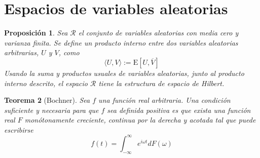 \documentclass[12pt,letterpaper,draft]{book}
\newtheorem{teorema}{Teorema}[chapter]
\newtheorem{proposicion}[teorema]{Proposición}
\newcommand{\R}{\mathbb{R}}
\newcommand{\C}{\mathbb{C}}
\newcommand{\intR}{\int_{-\infty}^{\infty}}
\newcommand{\E}[1]{\mathrm{E}\left[ #1 \right]}
\newcommand{\abso}[1]{\left| #1 \right|}
\begin{document}

\section{Espacios de variables aleatorias}

\begin{proposicion}
Sea $\mathcal{R}$ el conjunto de variables aleatorias con media cero y varianza finita. Se define un producto interno entre dos variables aleatorias arbitrarias, $U$ y $V$, como
\begin{equation}
\langle U , V \rangle := \E{U, \overline{V}}
\end{equation}
Usando la suma y productos usuales de variables aleatorias, junto al producto interno descrito, el espacio $\mathcal{R}$ tiene la estructura de espacio de Hilbert.
\end{proposicion}

\begin{teorema}[Bochner]
Sea $f$ una función real arbitraria. Una condición suficiente y necesaria para que $f$ sea definida positiva es que exista una función real $F$ monótonamente creciente, continua por la derecha y acotada tal que puede escribirse
\begin{equation}
f(t) = \intR e^{i \omega t} dF(\omega)
\end{equation}
\end{teorema}

\end{document}
